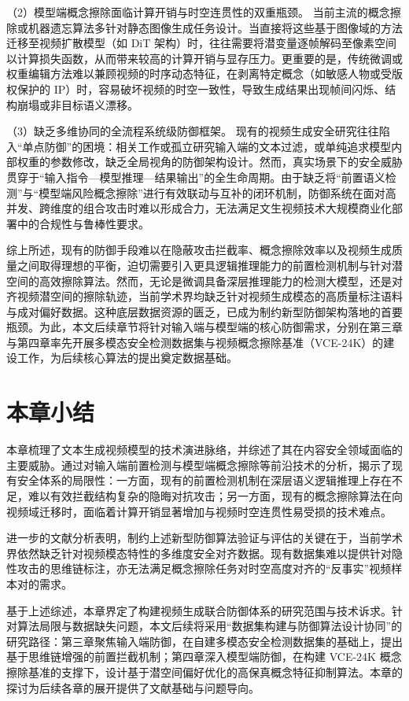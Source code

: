 （2）模型端概念擦除面临计算开销与时空连贯性的双重瓶颈。
当前主流的概念擦除或机器遗忘算法多针对静态图像生成任务设计。当直接将这些基于图像域的方法迁移至视频扩散模型（如 DiT 架构）时，往往需要将潜变量逐帧解码至像素空间以计算损失函数，从而带来较高的计算开销与显存压力。更重要的是，传统微调或权重编辑方法难以兼顾视频的时序动态特征，在剥离特定概念（如敏感人物或受版权保护的 IP）时，容易破坏视频的时空一致性，导致生成结果出现帧间闪烁、结构崩塌或非目标语义漂移。

（3）缺乏多维协同的全流程系统级防御框架。
现有的视频生成安全研究往往陷入“单点防御”的困境：相关工作或孤立研究输入端的文本过滤，或单纯追求模型内部权重的参数修改，缺乏全局视角的防御架构设计。然而，真实场景下的安全威胁贯穿于“输入指令—模型推理—结果输出”的全生命周期。由于缺乏将“前置语义检测”与“模型端风险概念擦除”进行有效联动与互补的闭环机制，防御系统在面对高并发、跨维度的组合攻击时难以形成合力，无法满足文生视频技术大规模商业化部署中的合规性与鲁棒性要求。

综上所述，现有的防御手段难以在隐蔽攻击拦截率、概念擦除效率以及视频生成质量之间取得理想的平衡，迫切需要引入更具逻辑推理能力的前置检测机制与针对潜空间的高效擦除算法。然而，无论是微调具备深层推理能力的检测大模型，还是对齐视频潜空间的擦除轨迹，当前学术界均缺乏针对视频生成模态的高质量标注语料与成对偏好数据。这种底层数据资源的匮乏，已成为制约新型防御架构落地的首要瓶颈。为此，本文后续章节将针对输入端与模型端的核心防御需求，分别在第三章与第四章率先开展多模态安全检测数据集与视频概念擦除基准（VCE-24K）的建设工作，为后续核心算法的提出奠定数据基础。

\section{本章小结}

本章梳理了文本生成视频模型的技术演进脉络，并综述了其在内容安全领域面临的主要威胁。通过对输入端前置检测与模型端概念擦除等前沿技术的分析，揭示了现有安全体系的局限性：一方面，现有的前置检测机制在深层语义逻辑推理上存在不足，难以有效拦截结构复杂的隐晦对抗攻击；另一方面，现有的概念擦除算法在向视频域迁移时，面临着计算开销显著增加与视频时空连贯性易受损的技术难点。

进一步的文献分析表明，制约上述新型防御算法验证与评估的关键在于，当前学术界依然缺乏针对视频模态特性的多维度安全对齐数据。现有数据集难以提供针对隐性攻击的思维链标注，亦无法满足概念擦除任务对时空高度对齐的“反事实”视频样本对的需求。

基于上述综述，本章界定了构建视频生成联合防御体系的研究范围与技术诉求。针对算法局限与数据缺失问题，本文后续将采用“数据集构建与防御算法设计协同”的研究路径：第三章聚焦输入端防御，在自建多模态安全检测数据集的基础上，提出基于思维链增强的前置拦截机制；第四章深入模型端防御，在构建 VCE-24K 概念擦除基准的支撑下，设计基于潜空间偏好优化的高保真概念特征抑制算法。本章的探讨为后续各章的展开提供了文献基础与问题导向。
